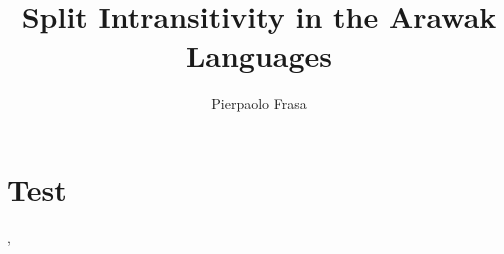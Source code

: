 \documentclass[a4paper]{scrreprt}
\author{Pierpaolo Frasa}
\title{Split Intransitivity in the Arawak Languages}
\begin{document}


\setcounter{page}{1}
\tableofcontents


\chapter{Test}
\citet{arkadiev2008}, \citet{donohue2008}


\end{document}
